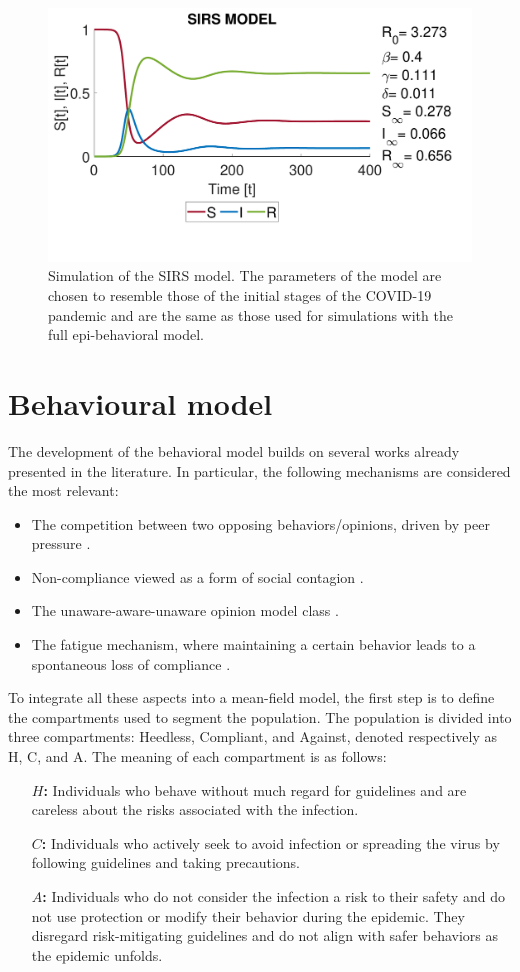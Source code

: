 \begin{figure}[h]
	\centering
	\includegraphics[width=0.6\linewidth]{1_corpo/figure/r0/sirs_figure}
	\caption[SIRS simulation]{Simulation of the SIRS model. The parameters of the model are chosen to resemble those of the initial stages of the COVID-19 pandemic \cite{data_R0_covid} and are the same as those used for simulations with the full epi-behavioral model.}
	\label{fig:sirsfigure}
\end{figure}

\section{Behavioural model}
\label{sec:behavioral_model}

The development of the behavioral model builds on several works already presented in the literature. In particular, the following mechanisms are considered the most relevant:
\begin{itemize}
	\item The competition between two opposing behaviors/opinions, driven by peer pressure \cite{Epstein_2021}.
	\item Non-compliance viewed as a form of social contagion \cite{Bongarti2023}.
	\item The unaware-aware-unaware opinion model class \cite{Zuo2022, Peng2021}.
	\item The fatigue mechanism, where maintaining a certain behavior leads to a spontaneous loss of compliance \cite{Epstein_2021}.
\end{itemize}

To integrate all these aspects into a mean-field model, the first step is to define the compartments used to segment the population. The population is divided into three compartments: Heedless, Compliant, and Against, denoted respectively as H, C, and A. The meaning of each compartment is as follows:
\begin{itemize}
	\item[\textbf{$H$:}] Individuals who behave without much regard for guidelines and are careless about the risks associated with the infection.
	\item[\textbf{$C$:}] Individuals who actively seek to avoid infection or spreading the virus by following guidelines and taking precautions.
	\item[\textbf{$A$:}]Individuals who do not consider the infection a risk to their safety and do not use protection or modify their behavior during the epidemic. They disregard risk-mitigating guidelines and do not align with safer behaviors as the epidemic unfolds.
\end{itemize}

